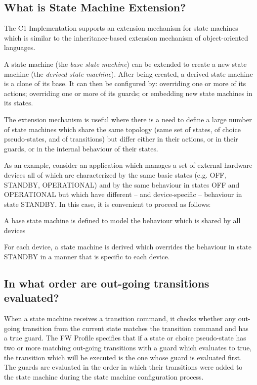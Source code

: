 \documentclass[faq]{../fwprofile}
\begin{document}
\subsection{What is State Machine Extension?}\label{faq:SM_Extension}
The C1 Implementation supports an extension mechanism for state machines which is similar to the inheritance-based extension mechanism of object-oriented languages.

A state machine (the \emph{base state machine}) can be extended to create a new state machine (the \emph{derived state machine}). After being created, 
a derived state machine is a clone of its base. It can then be configured by: overriding one or more of its actions; overriding one or more of its guards; 
or embedding new state machines in its states.

The extension mechanism is useful where there is a need to define a large number of state machines which share the same topology (same set of states, 
of choice pseudo-states, and of transitions) but differ either in their actions, or in their guards, or in the internal behaviour of their states.

As an example, consider an application which manages a set of external hardware devices all of which are characterized by the same basic 
states (e.g. OFF, STANDBY, OPERATIONAL) and by the same behaviour in states OFF and OPERATIONAL but which have different -- and device-specific -- 
behaviour in state STANDBY. In this case, it is convenient to proceed as follows:

\begin{fw_itemize} 
\item A base state machine is defined to model the behaviour which is shared by all devices
\item For each device, a state machine is derived which overrides the behaviour in state STANDBY in a manner that is specific to each device.
\end{fw_itemize}

\subsection{In what order are out-going transitions evaluated?}
When a state machine receives a transition command, it checks whether any out-going transition from the current state matches the transition command 
and has a true guard. The FW Profile specifies that if a state or choice pseudo-state has two or more matching out-going transitions with a guard which 
evaluates to true, the transition which will be executed is the one whose guard is evaluated first. The guards are evaluated in the order in which
their transitions were added to the state machine during the state machine configuration process.
\end{document}
